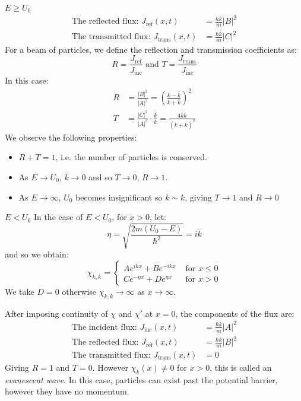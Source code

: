 \documentclass[../main.tex]{subfiles}
\begin{document}
\begin{proofcases}
\begin{case}{$E \geq U_0$}
\begin{align*}
      \text{The reflected flux: } J_{\text{ref}}(x, t) &= \frac{\hbar k}{m}|B|^2 \\
      \text{The transmitted flux: } J_{\text{trans}}(x, t) &= \frac{\hbar \overline{k}}{m}|C|^2
    \end{align*}
    For a beam of particles, we define the reflection and transmission coefficients as:
    \[
      R = \frac{J_{\text{ref}}}{J_{\text{inc}}} \text{ and } T = \frac{J_{\text{trans}}}{J_{\text{inc}}}
    \]
    In this case:
    \begin{align*}
      R &= \frac{|B|^2}{|A|^2} = \left(\frac{k - \overline{k}}{k + \overline{k}}\right)^2 \\
      T &= \frac{|C|^2}{|A|^2} \cdot \frac{\overline{k}}{k} = \frac{4k \overline{k}}{(k + \overline{k})^2}
    \end{align*}
    We observe the following properties:
    \begin{itemize}
      \item $R + T = 1$, i.e. the number of particles is conserved.
      \item As $E \to U_0$, $\overline{k} \to 0$ and so $T \to 0$, $R \to 1$.
      \item As $E \to \infty$, $U_0$ becomes insignificant so $\overline{k} \sim k$, giving $T \to 1$ and $R \to 0$
    \end{itemize}
  \end{case}
  \begin{case}{$E < U_0$}
    In the case of $E < U_0$, for $x > 0$, let:
    \[
      \eta = \sqrt{\frac{2m(U_0 - E)}{\hbar^2}} = i \overline{k}
    \]
    and so we obtain:
    \[
      \chi_{k, \overline{k}} = \begin{cases}
      Ae^{ikx} + Be^{-ikx} & \text{ for } x \leq 0 \\
      Ce^{-\eta x} + D e^{\eta x} & \text{ for } x > 0
      \end{cases}
    \]
    We take $D = 0$ otherwise $\chi_{k, \overline{k}} \to \infty$ as $x \to \infty$.

    After imposing continuity of $\chi$ and $\chi'$ at $x = 0$, the components of the flux are:
    \begin{align*}
      \text{The incident flux: } J_{\text{inc}}(x, t) &= \frac{\hbar k}{m}|A|^2 \\
      \text{The reflected flux: } J_{\text{ref}}(x, t) &= \frac{\hbar k}{m}|B|^2 \\
      \text{The transmitted flux: } J_{\text{trans}}(x, t) &= 0
    \end{align*}
    Giving $R = 1$ and $T = 0$.
    However $\chi_{\overline{k}}(x) \neq 0$ for $x > 0$, this is called an \textit{evanescent wave}.
    In this case, particles can exist past the potential barrier, however they have no momentum.
  \end{case}
\end{proofcases}
\end{document}
